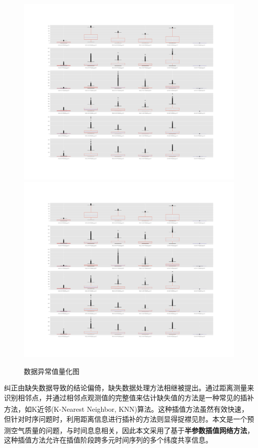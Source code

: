 \documentclass[a4paper,10pt]{my_paper}
\numberwithin{equation}{section}
\begin{document}
\begin{figure}[htb]
{  \includegraphics[width=1\textwidth]{box_plot_for_B.pdf}\\
  \includegraphics[width=1\textwidth]{box_plot_for_C.pdf}
  }
  \caption{数据异常值量化图}\label{fig_异常值}
\end{figure}


纠正由缺失数据导致的结论偏倚，缺失数据处理方法相继被提出。通过距离测量来识别相邻点，并通过相邻点观测值的完整值来估计缺失值的方法是一种常见的插补方法，如K近邻(K-Nearest Neighbor, KNN)算法\textsuperscript{\cite{ref3}}。这种插值方法虽然有效快速，但针对时序问题时，利用距离信息进行插补的方法则显得捉襟见肘。本文是一个预测空气质量的问题，与时间息息相关，因此本文采用了基于\textbf{半参数插值网络方法}\textsuperscript{\cite{ref4}}，这种插值方法允许在插值阶段跨多元时间序列的多个纬度共享信息。
\end{document}
